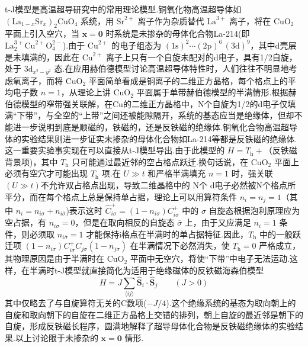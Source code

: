 t-J模型是高温超导研究中的常用理论模型.铜氧化物高温超导体如 $(\mathrm{La}_{1-x}\mathrm{Sr}_{x})_{2}\mathrm{CuO_{4}}$ 系统，用 $\mathrm{Sr}^{2+}$ 离子作为杂质替代 $\mathrm{La}^{3+}$ 离子，将在 $\mathrm{CuO_{2}}$ 平面上引入空穴，当 $\boldsymbol{x}=\boldsymbol{0}$ 时系统是未掺杂的母体化合物La-214(即 $\mathrm{La}_{2}^{3+}\mathrm{Cu}^{2+}\mathrm{O}_{4}^{2-}$).由于 $\mathrm{Cu}^{2+}$ 的电子组态为 $(1\mathrm{s})^{2}\cdots(2\mathrm{p})^{6}\,(3\mathrm{d})^{9}$，其中d壳层是未填满的，因此在 $\mathrm{Cu}^{2+}$ 离子上只有一个自旋未配对的d电子，具有1/2自旋，处于 $3\mathrm{d}_{x^{2}-y^{2}}$ 态.在应用赫伯德模型讨论高温超导体特性时，人们往往不明显地考虑氧离子，而将 $\mathrm{CuO_{2}}$ 平面简单看成是铜离子的二维正方晶格，每个格点上的平均电子数 $n=1$，从理论上讲 $\mathrm{CuO_{2}}$ 平面属于单带赫伯德模型的半满情形.根据赫伯德模型的窄带强关联解，在Cu的二维正方晶格中，N个自旋为1/2的d电子仅填满“下带”，与全空的“上带”之间还被能隙隔开，系统的基态应当是绝缘体，但却不能进一步说明到底是顺磁的，铁磁的，还是反铁磁的绝缘体.铜氧化合物高温超导体的实验结果则进一步证实未掺杂的母体化合物如La-214等都是反铁磁的绝缘体.这一重要实验事实现在可以直接从t-J模型导出.由于此模型的 $H=T_{\mathrm{h}}+$（反铁磁背景项)，其中 $T_{\mathrm{h}}$ 只可能通过最近邻的空占格点跃迁.换句话说，在 $\mathrm{CuO_{2}}$ 平面上必须有空穴才可能出现 $T_{\mathrm{h}}$ 项.在 $U\gg t$ 和严格半满填充 $n=1$ 时，强关联$(U\gg t)$不允许双占格点出现，导致二维晶格中的 N个 d电子必然被N个格点所平分，而在每个格点上总是保持单占据，理论上可以用算符条件 $n_{i}=n_{j}=1$（其中 $n_{i}=n_{i\sigma}+n_{i\overline{\sigma}}$)表示这时 $\hat{C}_{i\sigma}^{+}=(1-n_{i\sigma})C_{i\sigma}^{+}$ 中的 $\sigma$ 自旋态根据泡利原理应为空占据，有 $n_{i\sigma}=0$，但是在取向相反的自旋态 $\overline{\sigma}$ 上，由于又应满足 $n_{i}=1$ 条件，则必须取 $n_{i\overline{\sigma}}=1$ 才能保持i格点在半满时的单占据特征.因此，$T_{\mathrm{h}}$ 中的一般跃迁项 $(1-n_{i\sigma})C_{i\sigma}^{+}C_{j\sigma}(1-n_{j\sigma})$ 在半满情况下必然消失，使 $T_{\mathrm{h}}=0$ 严格成立，其物理原因是由于半满时在 $\mathrm{CuO_{2}}$ 平面中无空穴，将使“下带”中电子无法运动.这样，在半满时t-J模型就直接简化为适用于绝缘磁体的反铁磁海森伯模型
\begin{equation}
  H=J\sum_{\langle ij\rangle}\hat{\boldsymbol{S}}_{i}\cdot\hat{\boldsymbol{S}}_{j}\qquad(J>0)
\end{equation}
其中仅略去了与自旋算符无关的C数项($-J/4$).这个绝缘系统的基态为取向朝上的自旋和取向朝下的自旋在二维正方晶格上交错的排列，朝上自旋的最近邻是朝下的自旋，形成反铁磁长程序，圆满地解释了超导母体化合物是反铁磁绝缘体的实验结果.以上讨论限于未掺杂的 $\boldsymbol{x}=\boldsymbol{0}$ 情形.

